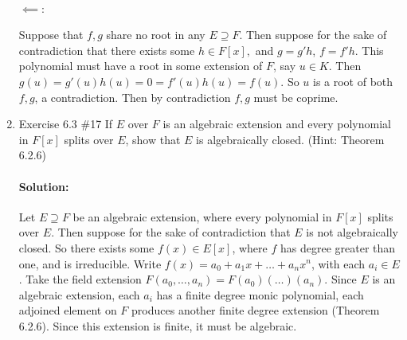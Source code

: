 \documentclass{article}
\begin{document}
\begin{enumerate}
\paragraph{$\impliedby:$ }
Suppose that $f,g $ share no root in any $E\supseteq F$. Then suppose for the sake of contradiction that there exists some $h\in F[x],$ and $g=g'h$, $f=f'h$.
This polynomial must have a root in some extension of $F$, say $u\in K$. Then $g(u)=g'(u)h(u)=0=f'(u)h(u)=f(u)$. So $u$ is a root of both $f,g$, a contradiction. Then by contradiction
$f,g$ must be coprime. %

\item Exercise 6.3 \#17 If $E$ over $F$ is an algebraic extension and every polynomial in
$F[x]$ splits over $E$, show that $E$ is algebraically closed. (Hint: Theorem 6.2.6)

\paragraph{Solution: }Let $E\supseteq F$ be an algebraic extension, where every polynomial in $F[x]$ splits over $E$. Then suppose for the sake of contradiction that 
$E$ is not algebraically closed. So there exists some $f(x)\in E[x]$, where $f$ has degree greater than one, and is irreducible. Write $f(x)=a_{0}+a_1x+\ldots+a_nx^{n}$,
with each $a_i\in E$. Take the field extension $F(a_0,\ldots,a_n)=F(a_0)(\ldots)(a_n)$. Since $E$ is an algebraic extension, each $a_i$ has a finite degree monic polynomial, 
each adjoined element on $F$ produces another finite degree extension (Theorem 6.2.6). Since this extension is finite, it must be algebraic. 

\end{enumerate}
\end{document}
